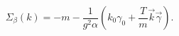 \begin{equation}
  \Sigma_\beta(k)=-m-\frac{1}{g^2\alpha}
\left(k_0\gamma_0+\frac{T}{m}\vec k\vec\gamma\right).
\end{equation}

